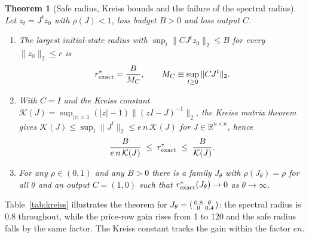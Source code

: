 \documentclass[12pt]{article}
\newtheorem{theorem}{Theorem}[section]
\theoremstyle{definition}
\theoremstyle{remark}
\newcommand{\R}{\mathbb{R}}
\begin{document}
\begin{theorem}[Safe radius, Kreiss bounds and the failure of the spectral radius]\label{thm:radius}
Let $z_t=J^tz_0$ with $\rho(J)<1$, loss budget $B>0$ and loss output $C$.
\begin{enumerate}[label=(\roman*)]
\item The largest initial-state radius with $\sup_t\|CJ^tz_0\|_2\le B$ for every $\|z_0\|_2\le r$ is
\begin{equation}\label{eq:rexact}
r^*_{\rm exact}=\frac{B}{M_C},\qquad M_C\equiv\sup_{t\ge0}\|CJ^t\|_2 .
\end{equation}
\item With $C=I$ and the Kreiss constant $\mathcal K(J)=\sup_{|z|>1}(|z|-1)\|(zI-J)^{-1}\|_2$, the Kreiss matrix theorem gives $\mathcal K(J)\le\sup_t\|J^t\|_2\le e\,n\,\mathcal K(J)$ for $J\in\R^{n\times n}$, hence
\begin{equation}\label{eq:kreiss}
\frac{B}{e\,n\,\mathcal K(J)}\;\le\;r^*_{\rm exact}\;\le\;\frac{B}{\mathcal K(J)} .
\end{equation}
\item For any $\rho\in(0,1)$ and any $B>0$ there is a family $J_\theta$ with $\rho(J_\theta)=\rho$ for all $\theta$ and an output $C=(1,0)$ such that $r^*_{\rm exact}(J_\theta)\to0$ as $\theta\to\infty$.
\end{enumerate}
\end{theorem}

Table~\ref{tab:kreiss} illustrates the theorem for $J_\theta=\begin{psmallmatrix}0.8&\theta\\0&0.4\end{psmallmatrix}$: the spectral radius is $0.8$ throughout, while the price-row gain rises from 1 to 120 and the safe radius falls by the same factor. The Kreiss constant tracks the gain within the factor $en$.
\end{document}
